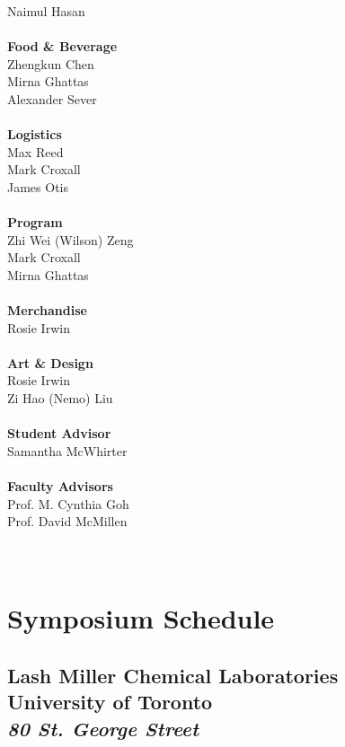 \documentclass[titlepage,oneside,openany,10pt]{book}
\begin{document}
\begin{multicols}{2}
    Naimul Hasan\\
    \\
    \noindent\textbf{Food \& Beverage}\\
    Zhengkun Chen\\
    Mirna Ghattas\\
    Alexander Sever\\
    \\
    \noindent\textbf{Logistics}\\
    Max Reed\\
    Mark Croxall\\
    James Otis\\
    \\
    \noindent\textbf{Program}\\
    Zhi Wei (Wilson) Zeng\\
    Mark Croxall\\
    Mirna Ghattas\\
    \\
    \noindent\textbf{Merchandise}\\
    Rosie Irwin\\
    \\
    \noindent\textbf{Art \& Design}\\
    Rosie Irwin\\
    Zi Hao (Nemo) Liu\\
    \\
    \textbf{Student Advisor}\\
    Samantha McWhirter\\
    \\
    \noindent\textbf{Faculty Advisors}\\
    Prof. M. Cynthia Goh\\
    Prof. David McMillen\\
    \\\
\end{multicols}


\chapter*{Symposium Schedule}
\label{chapter:schedule}
%
%
\section*{\textbf{Lash Miller Chemical Laboratories}\\University of Toronto\\\textit{80 St. George Street}}
%
%
\newpage
\end{document}
